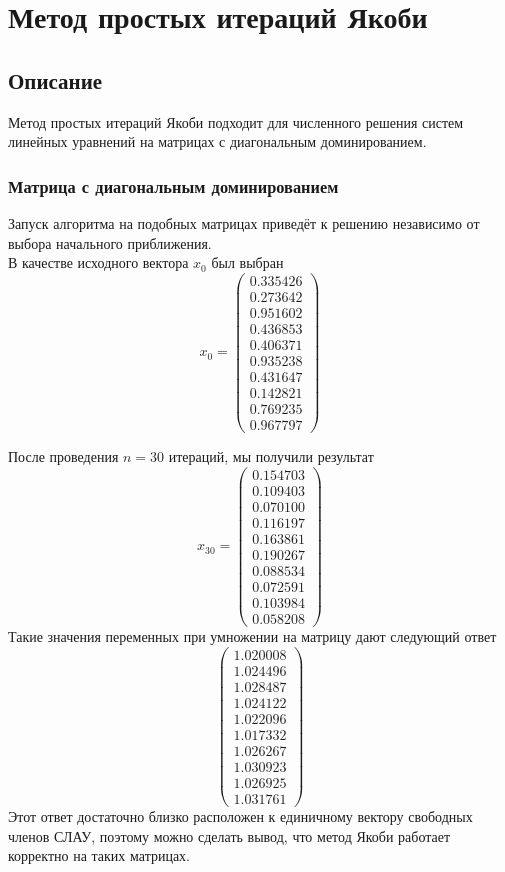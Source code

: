 \documentclass[../../report.tex]{subfiles}
\begin{document}
\chapter{Метод простых итераций Якоби}

\section{Описание}
Метод простых итераций Якоби подходит для численного решения 
систем линейных уравнений на матрицах с диагональным доминированием.

\subsection{Матрица с диагональным доминированием}
Запуск алгоритма на подобных матрицах приведёт к 
решению независимо от выбора начального приближения. \\
В качестве исходного вектора $x_0$ был выбран 
\[
x_0 = 
\begin{pmatrix} 
  0.335426 \\ 
  0.273642 \\ 
  0.951602 \\ 
  0.436853 \\ 
  0.406371 \\ 
  0.935238 \\ 
  0.431647 \\ 
  0.142821 \\ 
  0.769235 \\ 
  0.967797 
\end{pmatrix}
\]

После проведения $n = 30$ итераций, мы получили результат 
\[
x_{30} = 
\begin{pmatrix} 
0.154703 \\ 
0.109403 \\ 
0.070100 \\ 
0.116197 \\ 
0.163861 \\ 
0.190267 \\ 
0.088534 \\ 
0.072591 \\ 
0.103984 \\ 
0.058208  
\end{pmatrix}
\]
Такие значения переменных при умножении на матрицу дают следующий ответ
\[
\begin{pmatrix}
1.020008 \\
1.024496 \\
1.028487 \\
1.024122 \\
1.022096 \\
1.017332 \\
1.026267 \\
1.030923 \\
1.026925 \\
1.031761
\end{pmatrix}
\]
Этот ответ достаточно близко расположен к единичному вектору свободных членов СЛАУ,
поэтому можно сделать вывод, что метод Якоби работает корректно на таких матрицах.
\end{document}

